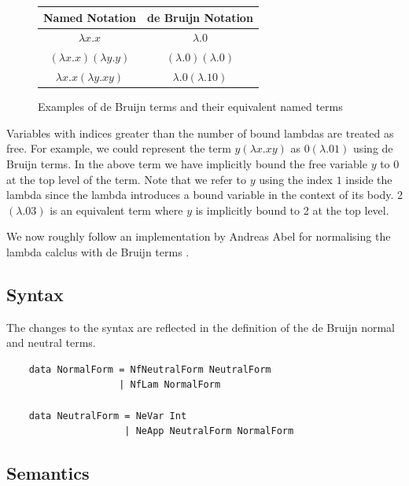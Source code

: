 \begin{figure}[h]
    \centering
    \begin{tabular}{ |c|c| } 
        \hline
        Named Notation & de Bruijn Notation \\
        \hline 
        $\lambda x.x$ & $\lambda . 0$ \\
        $(\lambda x. x)(\lambda y . y)$ & $(\lambda . 0)(\lambda . 0)$ \\
        $\lambda x. x (\lambda y. x y)$ & $\lambda . 0 (\lambda . 1 0 )$ \\
        \hline
    \end{tabular}
    \caption{Examples of de Bruijn terms and their equivalent named terms}
    \label{fig:deBruijnExamples}
\end{figure}




Variables with indices greater than the number of bound lambdas are treated as free. For example, we could represent the term $y (\lambda x.xy)$ as $0 (\lambda .01)$ using de Bruijn terms. In the above term we have implicitly bound the free variable $y$ to 0 at the top level of the term. Note that we refer to $y$ using the index $1$ inside the lambda since the lambda introduces a bound variable in the context of its body. 2 $(\lambda . 0 3)$ is an equivalent term where $y$ is implicitly bound to 2 at the top level.

We now roughly follow an implementation by Andreas Abel for normalising the lambda calclus with de Bruijn terms \cite{deBruijn}.

\subsection{Syntax}

The changes to the syntax are reflected in the definition of the de Bruijn normal and neutral terms. 

\begin{lstlisting}
    data NormalForm = NfNeutralForm NeutralForm
                    | NfLam NormalForm

    data NeutralForm = NeVar Int
                     | NeApp NeutralForm NormalForm
\end{lstlisting}

\subsection{Semantics}

